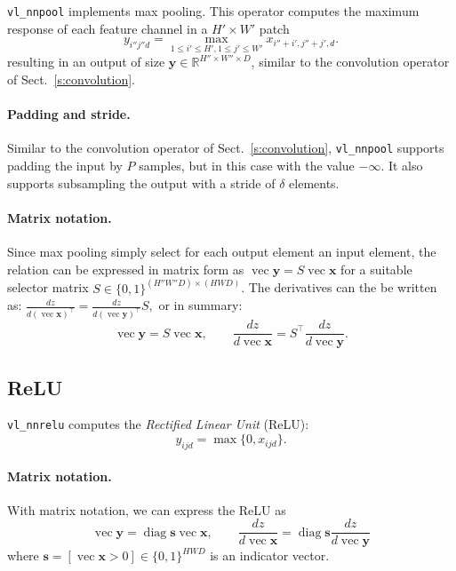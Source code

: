 \documentclass[12pt]{article}
\newcommand{\real}{\mathbb{R}}
\newcommand{\vv}{\operatorname{vec}}
\newcommand{\diag}{\operatorname{diag}}
\newcommand{\bx}{\mathbf{x}}
\newcommand{\by}{\mathbf{y}}
\newcommand{\bs}{\mathbf{s}}
\begin{document}
\verb!vl_nnpool! implements max pooling. This operator computes the maximum response of each feature channel in a $H' \times W'$ patch
\[
y_{i''j''d} = \max_{1\leq i' \leq H', 1 \leq j' \leq W'} x_{i''+i',j''+j',d}.
\]
resulting in an output of size $\by\in\real^{H''\times W'' \times D}$, similar to the convolution operator of Sect.~\ref{s:convolution}.

\paragraph{Padding and stride.} Similar to the convolution operator of Sect.~\ref{s:convolution}, \verb!vl_nnpool! supports padding the input by $P$ samples, but in this case with the value $-\infty$. It also supports subsampling the output with a stride of $\delta$ elements.

\paragraph{Matrix notation.} Since max pooling simply select for each output element an input element, the relation can be expressed in matrix form as
$
    \vv\by = S \vv \bx
$
for a suitable selector matrix $S\in\{0,1\}^{(H''W''D) \times (HWD)}$. The derivatives can the be written as:
$
\frac{d z}{d (\vv \bx)^\top}
=
\frac{d z}{d (\vv \by)^\top}
S,
$
or in summary:
\begin{equation}\label{e:max-mat}
\boxed{
\vv\by = S \vv \bx,
\qquad
\frac{d z}{d \vv \bx}
=
S^\top
\frac{d z}{d \vv \by}.
}
\end{equation}

\subsection{ReLU}\label{s:relu}

\verb!vl_nnrelu! computes the \emph{Rectified Linear Unit} (ReLU):
\[
 y_{ijd} = \max\{0, x_{ijd}\}.
\]

\paragraph{Matrix notation.} With matrix notation, we can express the ReLU as
\[
\boxed{
\vv\by = \diag\bs \vv \bx,
\qquad
\frac{d z}{d \vv \bx}
=
\diag\bs
\frac{d z}{d \vv \by}
}
\]
where $\bs = [\vv \bx > 0] \in\{0,1\}^{HWD}$ is an indicator vector.
\end{document}
